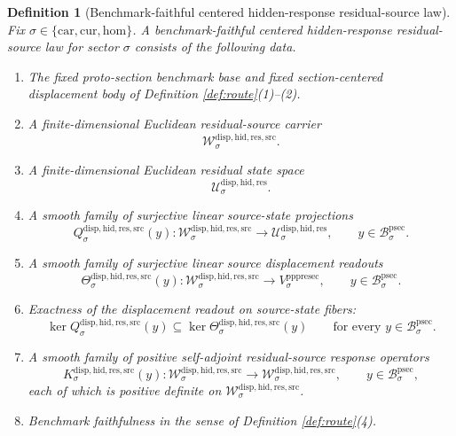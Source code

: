 \documentclass[11pt]{article}
\newcommand{\Car}{\mathrm{car}}
\newcommand{\Cur}{\mathrm{cur}}
\newcommand{\Hom}{\mathrm{hom}}
\newcommand{\ProtoSectionBody}[1]{\mathcal B_{#1}^{\mathrm{psec}}}
\newcommand{\PrePreProtoSectionVertical}[1]{V_{#1}^{\mathrm{pppresec}}}
\newcommand{\ResidualState}[1]{\mathcal U_{#1}^{\mathrm{disp,hid,res}}}
\newcommand{\ResidualSourceCarrier}[1]{\mathcal W_{#1}^{\mathrm{disp,hid,res,src}}}
\newcommand{\ResidualSourceProjection}[1]{Q_{#1}^{\mathrm{disp,hid,res,src}}}
\newcommand{\ResidualSourceReadout}[1]{\Theta_{#1}^{\mathrm{disp,hid,res,src}}}
\newcommand{\ResidualSourceOperator}[1]{K_{#1}^{\mathrm{disp,hid,res,src}}}
\newtheorem{definition}{Definition}
\begin{document}
\begin{definition}[Benchmark-faithful centered hidden-response residual-source law]
\label{def:source}
Fix \(\sigma\in\{\Car,\Cur,\Hom\}\). A \emph{benchmark-faithful centered hidden-response residual-source law} for sector \(\sigma\) consists of the following data.
\begin{enumerate}
    \item The fixed proto-section benchmark base and fixed section-centered displacement body of Definition \ref{def:route}(1)--(2).
    \item A finite-dimensional Euclidean residual-source carrier
    \[
    \ResidualSourceCarrier{\sigma}.
    \]
    \item A finite-dimensional Euclidean residual state space
    \[
    \ResidualState{\sigma}.
    \]
    \item A smooth family of surjective linear source-state projections
    \[
    \ResidualSourceProjection{\sigma}(y):
    \ResidualSourceCarrier{\sigma}\to\ResidualState{\sigma},
    \qquad
    y\in\ProtoSectionBody{\sigma}.
    \]
    \item A smooth family of surjective linear source displacement readouts
    \[
    \ResidualSourceReadout{\sigma}(y):
    \ResidualSourceCarrier{\sigma}\to\PrePreProtoSectionVertical{\sigma},
    \qquad
    y\in\ProtoSectionBody{\sigma}.
    \]
    \item Exactness of the displacement readout on source-state fibers:
    \[
    \ker \ResidualSourceProjection{\sigma}(y)
    \subseteq
    \ker \ResidualSourceReadout{\sigma}(y)
    \qquad
    \text{for every }
    y\in\ProtoSectionBody{\sigma}.
    \]
    \item A smooth family of positive self-adjoint residual-source response operators
    \[
    \ResidualSourceOperator{\sigma}(y):
    \ResidualSourceCarrier{\sigma}\to\ResidualSourceCarrier{\sigma},
    \qquad
    y\in\ProtoSectionBody{\sigma},
    \]
    each of which is positive definite on \(\ResidualSourceCarrier{\sigma}\).
    \item Benchmark faithfulness in the sense of Definition \ref{def:route}(4).
\end{enumerate}
\end{definition}
\end{document}
